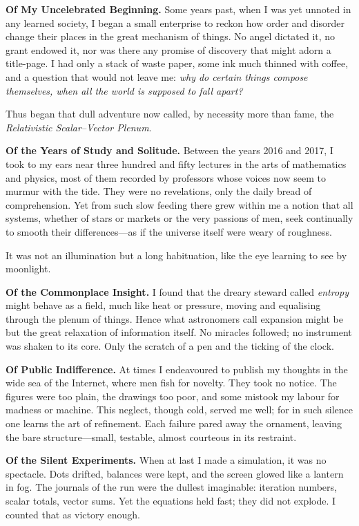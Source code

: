 \documentclass[12pt]{article}
\begin{document}
\textbf{Of My Uncelebrated Beginning.}
Some years past, when I was yet unnoted in any learned society, I began a small enterprise to reckon how order and disorder change their places in the great mechanism of things. 
No angel dictated it, no grant endowed it, nor was there any promise of discovery that might adorn a title-page. 
I had only a stack of waste paper, some ink much thinned with coffee, and a question that would not leave me: \textit{why do certain things compose themselves, when all the world is supposed to fall apart?}

Thus began that dull adventure now called, by necessity more than fame, the \textit{Relativistic Scalar--Vector Plenum}.

\textbf{Of the Years of Study and Solitude.}
Between the years 2016 and 2017, I took to my ears near three hundred and fifty lectures in the arts of mathematics and physics, most of them recorded by professors whose voices now seem to murmur with the tide. 
They were no revelations, only the daily bread of comprehension. 
Yet from such slow feeding there grew within me a notion that all systems, whether of stars or markets or the very passions of men, seek continually to smooth their differences---as if the universe itself were weary of roughness.

It was not an illumination but a long habituation, like the eye learning to see by moonlight.

\textbf{Of the Commonplace Insight.}
I found that the dreary steward called \textit{entropy} might behave as a field, much like heat or pressure, moving and equalising through the plenum of things. 
Hence what astronomers call expansion might be but the great relaxation of information itself.
No miracles followed; no instrument was shaken to its core. 
Only the scratch of a pen and the ticking of the clock.

\textbf{Of Public Indifference.}
At times I endeavoured to publish my thoughts in the wide sea of the Internet, where men fish for novelty. 
They took no notice. 
The figures were too plain, the drawings too poor, and some mistook my labour for madness or machine.
This neglect, though cold, served me well; for in such silence one learns the art of refinement. 
Each failure pared away the ornament, leaving the bare structure---small, testable, almost courteous in its restraint.

\textbf{Of the Silent Experiments.}
When at last I made a simulation, it was no spectacle. 
Dots drifted, balances were kept, and the screen glowed like a lantern in fog. 
The journals of the run were the dullest imaginable: iteration numbers, scalar totals, vector sums. 
Yet the equations held fast; they did not explode.
I counted that as victory enough.
\end{document}
